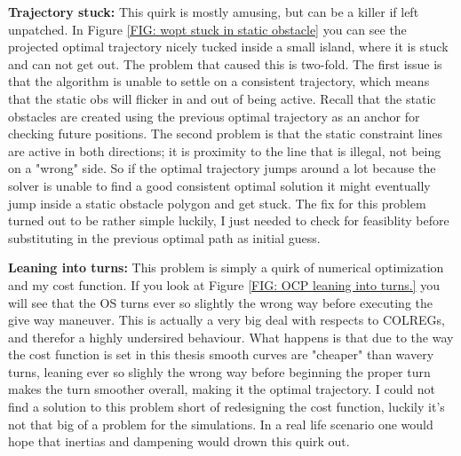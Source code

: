 \textbf{Trajectory stuck:}\newline
This quirk is mostly amusing, but can be a killer if left unpatched. In Figure \ref{FIG: wopt stuck in static obstacle} you can
see the projected optimal trajectory nicely tucked inside a small island, where it is stuck and can not get out. The problem that caused
this is two-fold. The first issue is that the algorithm is unable to settle on a consistent trajectory, which means that the static obs
will flicker in and out of being active. Recall that the static obstacles are created using the previous optimal trajectory as an
anchor for checking future positions. The second problem is that the static constraint lines are active in both directions; it is proximity
to the line that is illegal, not being on a "wrong" side. So if the optimal trajectory jumps around a lot because the solver is unable
to find a good consistent optimal solution it might eventually jump inside a static obstacle polygon and get stuck. The fix for this
problem turned out to be rather simple luckily, I just needed to check for feasiblity before substituting in the previous
optimal path as initial guess.

\textbf{Leaning into turns:}\newline
This problem is simply a quirk of numerical optimization and my cost function. If you look at Figure \ref{FIG: OCP leaning into turns.}
you will see that the OS turns ever so slightly the wrong way before executing the give way maneuver. This is actually a very big deal with
respects to COLREGs, and therefor a highly undersired behaviour. What happens is that due to the way the cost function is set
in this thesis smooth curves are "cheaper" than wavery turns, leaning ever so slighly the wrong way before beginning the proper turn
makes the turn smoother overall, making it the optimal trajectory. I could not find a solution to this problem short of redesigning
the cost function, luckily it's not that big of a problem for the simulations. In a real life scenario one would hope that
inertias and dampening would drown this quirk out.

